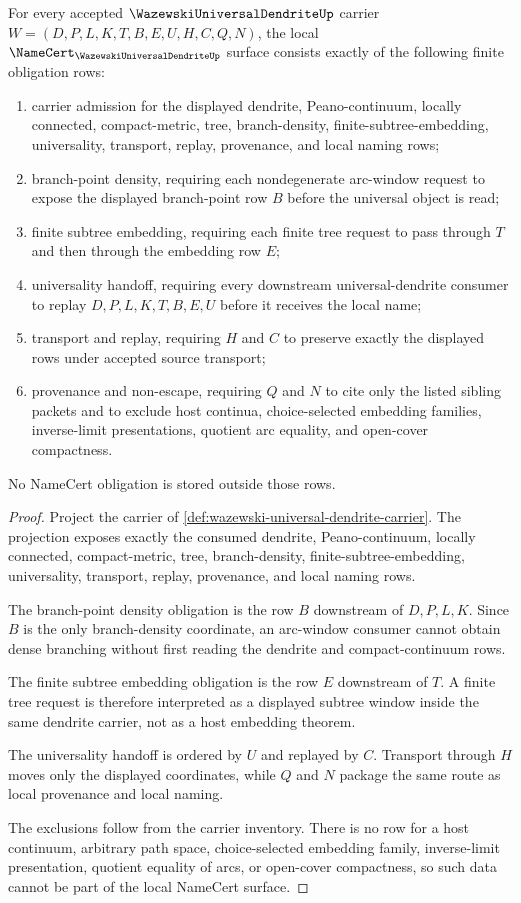 \begin{theorem}
\label{thm:wazewski-universal-dendrite-namecert-obligations}
For every accepted $\WazewskiUniversalDendriteUp$ carrier $W=(D,P,L,K,T,B,E,U,H,C,Q,N)$, the local $\NameCert_{\WazewskiUniversalDendriteUp}$ surface consists exactly of the following finite obligation rows:
\begin{enumerate}
\item carrier admission for the displayed dendrite, Peano-continuum, locally connected, compact-metric, tree, branch-density, finite-subtree-embedding, universality, transport, replay, provenance, and local naming rows;
\item branch-point density, requiring each nondegenerate arc-window request to expose the displayed branch-point row $B$ before the universal object is read;
\item finite subtree embedding, requiring each finite tree request to pass through $T$ and then through the embedding row $E$;
\item universality handoff, requiring every downstream universal-dendrite consumer to replay $D,P,L,K,T,B,E,U$ before it receives the local name;
\item transport and replay, requiring $H$ and $C$ to preserve exactly the displayed rows under accepted source transport;
\item provenance and non-escape, requiring $Q$ and $N$ to cite only the listed sibling packets and to exclude host continua, choice-selected embedding families, inverse-limit presentations, quotient arc equality, and open-cover compactness.
\end{enumerate}
No NameCert obligation is stored outside those rows.
\end{theorem}
\begin{proof}
Project the carrier of \autoref{def:wazewski-universal-dendrite-carrier}. The projection exposes exactly the consumed dendrite, Peano-continuum, locally connected, compact-metric, tree, branch-density, finite-subtree-embedding, universality, transport, replay, provenance, and local naming rows.

The branch-point density obligation is the row $B$ downstream of $D,P,L,K$. Since $B$ is the only branch-density coordinate, an arc-window consumer cannot obtain dense branching without first reading the dendrite and compact-continuum rows.

The finite subtree embedding obligation is the row $E$ downstream of $T$. A finite tree request is therefore interpreted as a displayed subtree window inside the same dendrite carrier, not as a host embedding theorem.

The universality handoff is ordered by $U$ and replayed by $C$. Transport through $H$ moves only the displayed coordinates, while $Q$ and $N$ package the same route as local provenance and local naming.

The exclusions follow from the carrier inventory. There is no row for a host continuum, arbitrary path space, choice-selected embedding family, inverse-limit presentation, quotient equality of arcs, or open-cover compactness, so such data cannot be part of the local NameCert surface.
\end{proof}
